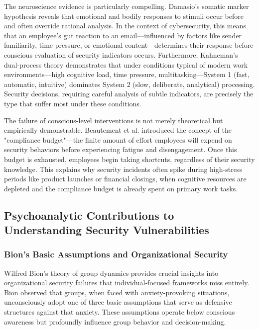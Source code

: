 \documentclass[11pt,a4paper]{article}
\begin{document}
The neuroscience evidence is particularly compelling. Damasio's somatic marker hypothesis\cite{damasio1994} reveals that emotional and bodily responses to stimuli occur before and often override rational analysis. In the context of cybersecurity, this means that an employee's gut reaction to an email—influenced by factors like sender familiarity, time pressure, or emotional content—determines their response before conscious evaluation of security indicators occurs. Furthermore, Kahneman's dual-process theory\cite{kahneman2011} demonstrates that under conditions typical of modern work environments—high cognitive load, time pressure, multitasking—System 1 (fast, automatic, intuitive) dominates System 2 (slow, deliberate, analytical) processing. Security decisions, requiring careful analysis of subtle indicators, are precisely the type that suffer most under these conditions.

The failure of conscious-level interventions is not merely theoretical but empirically demonstrable. Beautement et al.\cite{beautement2008} introduced the concept of the "compliance budget"—the finite amount of effort employees will expend on security behaviors before experiencing fatigue and disengagement. Once this budget is exhausted, employees begin taking shortcuts, regardless of their security knowledge. This explains why security incidents often spike during high-stress periods like product launches or financial closings, when cognitive resources are depleted and the compliance budget is already spent on primary work tasks.

\subsection{Psychoanalytic Contributions to Understanding Security Vulnerabilities}

\subsubsection{Bion's Basic Assumptions and Organizational Security}

Wilfred Bion's theory of group dynamics\cite{bion1961} provides crucial insights into organizational security failures that individual-focused frameworks miss entirely. Bion observed that groups, when faced with anxiety-provoking situations, unconsciously adopt one of three basic assumptions that serve as defensive structures against that anxiety. These assumptions operate below conscious awareness but profoundly influence group behavior and decision-making.
\end{document}
